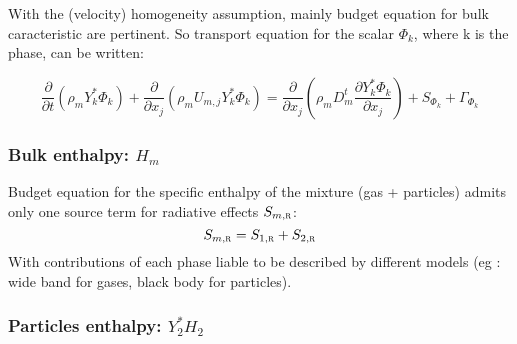 With the (velocity) homogeneity assumption, mainly budget equation for bulk
caracteristic are pertinent. So transport equation for the scalar $\Phi_{k}$,
where k is the phase, can be written:

\begin{equation}
  \frac{\partial}{\partial t    } (\rho_{m} Y_{k}^{*}\Phi_{k})
 +\frac{\partial}{\partial x_{j}} (\rho_{m} U_{m,j} Y_{k}^{*} \Phi_{k})
              = \frac{\partial}{\partial x_{j}} 
                       (\rho_{m}D_{m}^{t} \frac{\partial Y_{k}^{*} \Phi_{k}}{\partial x_{j}})
               +S_{\Phi_{k}}+\Gamma_{\Phi_{k}}
\end{equation}


\subsubsection*{Bulk enthalpy: $H_{m}$ }

Budget equation for the specific enthalpy of the mixture (gas + particles)
admits only one source term for radiative effects
$S_{m,\mbox{\scriptsize\textsc{r}}}$:
\begin{equation}
    S_{m,\mbox{\scriptsize\textsc{r}}}= S_{1,\mbox{\scriptsize\textsc{r}}}+ S_{2,\mbox{\scriptsize\textsc{r}}}
\end{equation}
With contributions of each phase liable to be described by different models (eg
: wide band for gases, black body for particles).

\subsubsection*{Particles enthalpy: $Y_{2}^{*}H_{2}$ }

